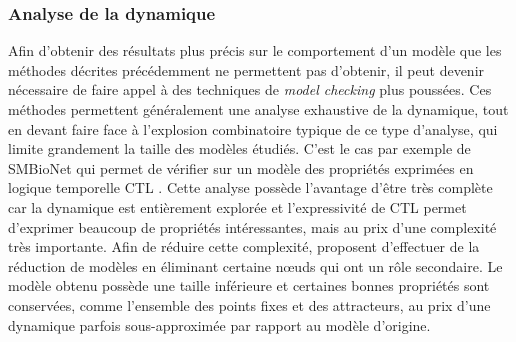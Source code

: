 \subsubsection*{Analyse de la dynamique}
Afin d'obtenir des résultats plus précis sur le comportement d'un modèle
que les méthodes décrites précédemment ne permettent pas d'obtenir,
il peut devenir nécessaire de faire appel à des techniques
de \textit{model checking} plus poussées.
Ces méthodes permettent généralement une analyse exhaustive de la dynamique,
tout en devant faire face à l'explosion combinatoire typique de ce type d'analyse,
qui limite grandement la taille des modèles étudiés.
C'est le cas par exemple de SMBioNet \cite{Richard06} qui permet de vérifier sur un modèle
des propriétés exprimées en logique temporelle CTL \cite{Clarke82}.
Cette analyse possède l'avantage d'être très complète
car la dynamique est entièrement explorée et l'expressivité de CTL permet
d'exprimer beaucoup de propriétés intéressantes,
mais au prix d'une complexité très importante.
Afin de réduire cette complexité,
 proposent d'effectuer de la réduction de modèles
en éliminant certaine nœuds qui ont un rôle secondaire.
Le modèle obtenu possède une taille inférieure et certaines bonnes propriétés sont conservées,
comme l'ensemble des points fixes et des attracteurs,
au prix d'une dynamique parfois sous-approximée par rapport au modèle d'origine.
